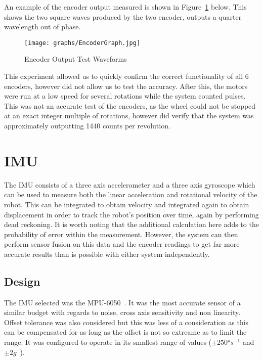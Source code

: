 An example of the encoder output measured is shown in Figure~\ref{EncoderGraph} below. This shows the two square waves produced by the
two encoder, outputs a quarter wavelength out of phase.

\begin{figure}[!ht]
	\centering
	\texttt{[image: graphs/EncoderGraph.jpg]}
	\caption{Encoder Output Test Waveforms}\label{EncoderGraph}

\end{figure}

This experiment allowed us to quickly confirm the correct functionality
of all 6 encoders, however did not allow us to test the accuracy. After
this, the motors were run at a low speed for several rotations while the
system counted pulses. This was not an accurate test of the encoders, as
the wheel could not be stopped at an exact integer multiple of rotations,
however did verify that the system was approximately outputting 1440
counts per revolution.

\section{IMU}\label{elec/imu}
The IMU consists of a three axis accelerometer and a three axis gyroscope
which can be used to measure both the linear acceleration and rotational
velocity of the robot. This can be integrated to obtain velocity and integrated again
to obtain displacement in order to track the robot's position over time, again by performing dead reckoning. It is worth noting
that the additional calculation here adds to the probability of error within the measurement. However, the
system can then perform sensor fusion on this data and the encoder
readings to get far more accurate results than is possible with either system
independently.

\subsection{Design}\label{elec/imu/design}
The IMU selected was the MPU-6050~\cite{MPU6050Datasheet}. It was the most accurate sensor of a
similar budget with regards to noise, cross axis sensitivity and non
linearity. Offset tolerance was also considered but this was less of a
consideration as this can be compensated for as long as the offset is not
so extreame as to limit the range. It was configured to operate in its
smallest range of values ($\pm\ang{250}s^{-1}$ and $\pm2g$~\cite{MPU6050Datasheet}).

